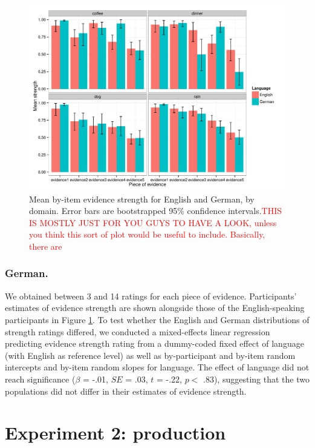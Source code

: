 \documentclass[11pt]{article}
\newcommand{\red}[1]{\textcolor{Red}{#1}}
\newcommand{\figref}[1]{Figure \ref{#1}}
\begin{document}
\begin{figure}
\centering
\includegraphics[width=\textwidth]{pics/mean-evidencestrength-byitem}
\caption{Mean by-item evidence strength for English and German, by domain. Error bars are bootstrapped 95\% confidence intervals.\red{THIS IS MOSTLY JUST FOR YOU GUYS TO HAVE A LOOK, unless you think this sort of plot would be useful to include. Basically, there are }}
\label{fig:evidencestrength}
\end{figure}

\subsubsection{German.}
We obtained between 3 and 14 ratings for each piece of evidence. Participants' estimates of evidence strength are shown alongside those of the English-speaking participants in  \figref{fig:evidencestrength}. To test whether the English and German distributions of strength ratings differed, we conducted a mixed-effects linear regression predicting evidence strength rating from a dummy-coded fixed effect of language (with English as reference level) as well as by-participant and by-item random intercepts and by-item random slopes for language. The effect of language did not reach significance ($\beta$ = -.01, $SE$ = .03, $t$ = -.22, $p <$ .83), suggesting that the two populations did not differ in their estimates of evidence strength.   

\section{Experiment 2: production}
\end{document}
